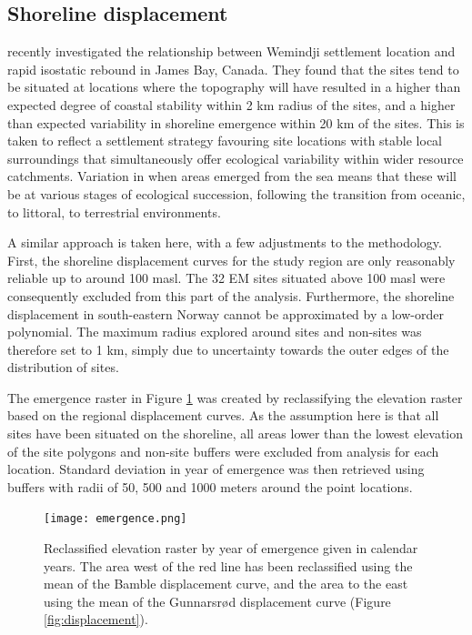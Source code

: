 \documentclass[12pt, a4paper]{article}
\begin{document}
\subsection{Shoreline displacement}
\cite{wren2018} recently investigated the relationship between Wemindji settlement location and rapid isostatic rebound in James Bay, Canada. They found that the sites tend to be situated at locations where the topography will have resulted in a higher than expected degree of coastal stability within 2 km radius of the sites, and a higher than expected variability in shoreline emergence within 20 km of the sites. This is taken to reflect a settlement strategy favouring site locations with stable local surroundings that simultaneously offer ecological variability within wider resource catchments. Variation in when areas emerged from the sea means that these will be at various stages of ecological succession, following the transition from oceanic, to littoral, to terrestrial environments. \par 
A similar approach is taken here, with a few adjustments to the methodology. First, the shoreline displacement curves for the study region are only reasonably reliable up to around 100 masl. The 32 EM sites situated above 100 masl were consequently excluded from this part of the analysis. Furthermore, the shoreline displacement in south-eastern Norway cannot be approximated by a low-order polynomial. The maximum radius explored around sites and non-sites was therefore set to 1 km, simply due to uncertainty towards the outer edges of the distribution of sites. \par The emergence raster in Figure \ref{fig:emerge} was created by reclassifying the elevation raster based on the regional displacement curves. As the assumption here is that all sites have been situated on the shoreline, all areas lower than the lowest elevation of the site polygons and non-site buffers were excluded from analysis for each location. Standard deviation in year of emergence was then retrieved using buffers with radii of 50, 500 and 1000 meters around the point locations. \par

\begin{figure}
	\centering
	\texttt{[image: emergence.png]}
	\caption{Reclassified elevation raster by year of emergence given in calendar years. The area west of the red line has been reclassified using the mean of the Bamble displacement curve, and the area to the east using the mean of the Gunnarsr{\o}d displacement curve (Figure \ref{fig:displacement}).}
	\label{fig:emerge}
\end{figure} 
\end{document}
